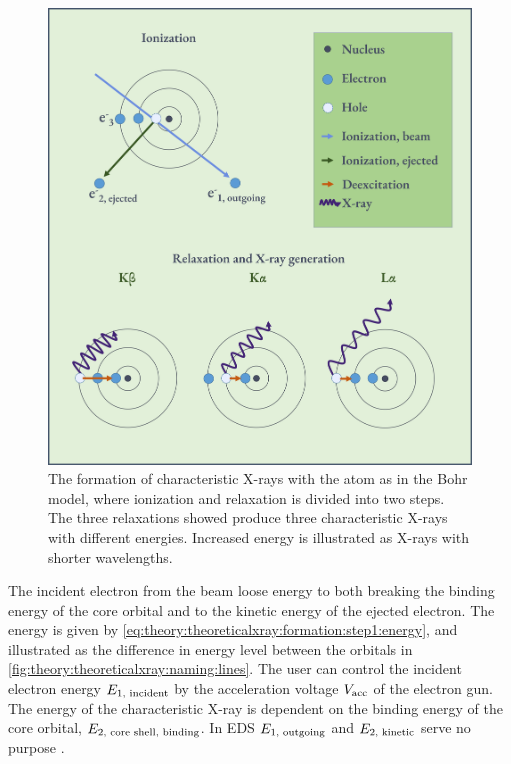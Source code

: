 \begin{figure}[htb]
    \centering
    \includegraphics[width=0.85\linewidth]{figures/formation_of_xrays_bohr.png}
    \caption{
        The formation of characteristic X-rays with the atom as in the Bohr model, where ionization and relaxation is divided into two steps.
        The three relaxations showed produce three characteristic X-rays with different energies.
        Increased energy is illustrated as X-rays with shorter wavelengths.
    }
    \label{fig:theory:theoreticalxray:formation}
\end{figure}


The incident electron from the beam loose energy to both breaking the binding energy of the core orbital and to the kinetic energy of the ejected electron.
The energy is given by \cref{eq:theory:theoreticalxray:formation:step1:energy}, and illustrated as the difference in energy level between the orbitals in \cref{fig:theory:theoreticalxray:naming:lines}.
The user can control the incident electron energy $E_{1 {\textnormal{, incident}}}$ by the acceleration voltage $V_{\textnormal{acc}}$ of the electron gun. %
The energy of the characteristic X-ray is dependent on the binding energy of the core orbital, $E_{2 {\textnormal{, core shell, binding}}}$.
In EDS $E_{1 {\textnormal{, outgoing}}}$ and $E_{2 {\textnormal{, kinetic}}}$ serve no purpose \cite[Eq. (4.1)]{goldstein_scanning_2018}.

